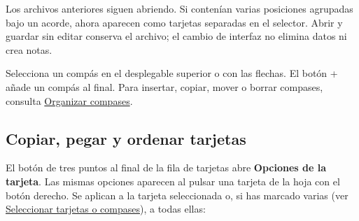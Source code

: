 \documentclass[a4paper,11pt]{article}
\begin{document}
Los archivos anteriores siguen abriendo. Si contenían varias posiciones
agrupadas bajo un acorde, ahora aparecen como tarjetas separadas en el
selector. Abrir y guardar sin editar conserva el archivo; el cambio de
interfaz no elimina datos ni crea notas.

Selecciona un compás en el desplegable superior o con las flechas. El
botón + añade un compás al final. Para insertar, copiar, mover o borrar
compases, consulta \hyperref[organizar-compases]{Organizar compases}.

\subsection{Copiar, pegar y ordenar
tarjetas}\label{copiar-pegar-y-ordenar-tarjetas}

El botón de tres puntos al final de la fila de tarjetas abre
\textbf{Opciones de la tarjeta}. Las mismas opciones aparecen al pulsar
una tarjeta de la hoja con el botón derecho. Se aplican a la tarjeta
seleccionada o, si has marcado varias (ver
\hyperref[seleccionar-tarjetas-o-compases]{Seleccionar tarjetas o
compases}), a todas ellas:
\end{document}
